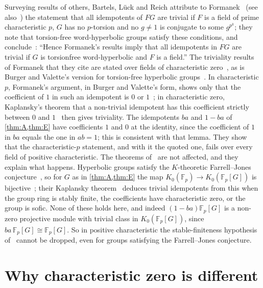 \documentclass[11pt]{article}
\theoremstyle{definition}
\theoremstyle{plain}
\newcommand{\F}{\mathbb{F}}
\begin{document}
\begin{remark}\label{rem:blr}
Surveying results of others, Bartels, L\"uck and Reich attribute to Formanek~\cite{Formanek1973} (see also~\cite[Lemma~4.1 and Prop.~4.2]{BurgerValette1998}) the statement that all idempotents of $FG$ are trivial if $F$ is a field of prime characteristic $p$, $G$ has no $p$-torsion and no $g\neq1$ is conjugate to some $g^{p^k}$; they note that torsion-free word-hyperbolic groups satisfy these conditions, and conclude~\cite[\S0.6, p.~9]{BLR2008}: ``Hence Formanek's results imply that all idempotents in $FG$ are trivial if $G$ is torsionfree word-hyperbolic and $F$ is a field.'' The triviality results of Formanek that they cite are stated over fields of characteristic zero~\cite[Thms.~1 and~9]{Formanek1973}, as is Burger and Valette's version for torsion-free hyperbolic groups~\cite[Prop.~4.2 and Remark~4.3]{BurgerValette1998}. In characteristic $p$, Formanek's argument, in Burger and Valette's form, shows only that the coefficient of $1$ in such an idempotent is $0$ or $1$~\cite[Lemma~4.1]{BurgerValette1998}; in characteristic zero, Kaplansky's theorem that a non-trivial idempotent has this coefficient strictly between $0$ and $1$~\cite[Thm.~2]{Formanek1973} then gives triviality. The idempotents $ba$ and $1-ba$ of \cref{thm:A,thm:E} have coefficients $1$ and $0$ at the identity, since the coefficient of $1$ in $ba$ equals the one in $ab=1$; this is consistent with that lemma. They show that the characteristic-$p$ statement, and with it the quoted one, fails over every field of positive characteristic. The theorems of~\cite{BLR2008} are not affected, and they explain what happens. Hyperbolic groups satisfy the $K$-theoretic Farrell--Jones conjecture~\cite[Thm.~0.1(i)]{BLR2008}, so for $G$ as in \cref{thm:A,thm:E} the map $K_0(\F_p)\to K_0(\F_p[G])$ is bijective~\cite[Thm.~0.2]{BLR2008}; their Kaplansky theorem~\cite[Thm.~0.12]{BLR2008} deduces trivial idempotents from this when the group ring is stably finite, the coefficients have characteristic zero, or the group is sofic. None of these holds here, and indeed $(1-ba)\F_p[G]$ is a non-zero projective module with trivial class in $K_0(\F_p[G])$, since $ba\,\F_p[G]\cong\F_p[G]$. So in positive characteristic the stable-finiteness hypothesis of~\cite[Thm.~0.12]{BLR2008} cannot be dropped, even for groups satisfying the Farrell--Jones conjecture.
\end{remark}

\section{Why characteristic zero is different}\label{sec:charzero}
\end{document}
